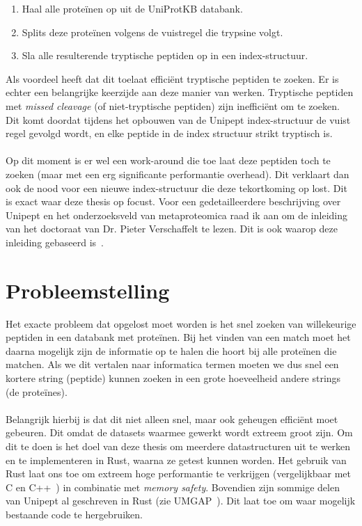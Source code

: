 \documentclass[11pt,dutch,faculty=we,layout=titlefont,underline=false,titleUppercase=true,titleUnderline=true]{ugent2016-report}
\begin{document}
    \begin{enumerate}
        \item Haal alle proteïnen op uit de UniProtKB databank.
        \item Splits deze proteïnen volgens de vuistregel die trypsine volgt.
        \item Sla alle resulterende tryptische peptiden op in een index-structuur.
    \end{enumerate}

    Als voordeel heeft dat dit toelaat efficiënt tryptische peptiden te zoeken.
    Er is echter een belangrijke keerzijde aan deze manier van werken.
    Tryptische peptiden met \textit{missed cleavage} (of niet-tryptische peptiden) zijn inefficiënt om te zoeken.
    Dit komt doordat tijdens het opbouwen van de Unipept index-structuur de vuist regel gevolgd wordt, en elke peptide in de index structuur strikt tryptisch is.
    \\ \\
    Op dit moment is er wel een work-around die toe laat deze peptiden toch te zoeken (maar met een erg significante performantie overhead).
    Dit verklaart dan ook de nood voor een nieuwe index-structuur die deze tekortkoming op lost.
    Dit is exact waar deze thesis op focust.
    \newline
    Voor een gedetailleerdere beschrijving over Unipept en het onderzoeksveld van metaproteomica raad ik aan om de inleiding van het doctoraat van Dr. Pieter Verschaffelt te lezen.
    Dit is ook waarop deze inleiding gebaseerd is~\cite{phdPieterUnipept}.


    \section{Probleemstelling}\label{sec:probleemstelling}
    Het exacte probleem dat opgelost moet worden is het snel zoeken van willekeurige peptiden in een databank met proteïnen.
    Bij het vinden van een match moet het daarna mogelijk zijn de informatie op te halen die hoort bij alle proteïnen die matchen.
    Als we dit vertalen naar informatica termen moeten we dus snel een kortere string (peptide) kunnen zoeken in een grote hoeveelheid andere strings (de proteïnes).
    \\ \\
    Belangrijk hierbij is dat dit niet alleen snel, maar ook geheugen efficiënt moet gebeuren.
    Dit omdat de datasets waarmee gewerkt wordt extreem groot zijn.
    Om dit te doen is het doel van deze thesis om meerdere datastructuren uit te werken en te implementeren in Rust, waarna ze getest kunnen worden.
    Het gebruik van Rust laat ons toe om extreem hoge performantie te verkrijgen (vergelijkbaar met C en C++~\cite{rustPerformantie}) in combinatie met \textit{memory safety}.
    Bovendien zijn sommige delen van Unipept al geschreven in Rust (zie UMGAP~\cite{UMGAP_paper, UMGAP_source}).
    Dit laat toe om waar mogelijk bestaande code te hergebruiken.
\end{document}
